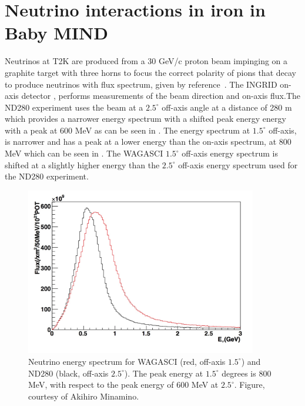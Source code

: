 \section{Neutrino interactions in iron in Baby MIND}

Neutrinos at T2K are produced from a 30 GeV/c proton beam impinging on a graphite target with three horns to focus the correct polarity of pions that decay to produce neutrinos with flux spectrum, given by reference~\cite{119T2K}. The INGRID on-axis detector \cite{120INGRID}, performs measurements of the beam direction and on-axis flux.The ND280 experiment uses the beam at a $2.5^\circ$ off-axis angle at a distance of 280 m which provides a narrower energy spectrum with a shifted peak energy energy with a peak at 600 MeV as can be seen in . The energy spectrum at $1.5^\circ$ off-axis, is narrower and has a peak at a lower energy than the on-axis spectrum, at 800 MeV which can be seen in . The WAGASCI $1.5^\circ$ off-axis energy spectrum is shifted at a slightly higher energy than the $2.5^\circ$ off-axis energy spectrum used for the ND280 experiment.


\begin{figure}[h!]
\centering
\includegraphics[width=0.9\textwidth]{figures/NeutrinoChap/ND280vsWAGASCIspectrum.jpeg}
\caption{Neutrino energy spectrum for WAGASCI (red, off-axis $1.5^\circ$) and ND280 (black, off-axis $2.5^\circ$). The peak energy at $1.5^\circ$ degrees is 800 MeV, with respect to the peak energy of 600 MeV at $2.5^\circ$. Figure, courtesy of Akihiro Minamino.}
\label{fig:T2KAxis}
\end{figure}

